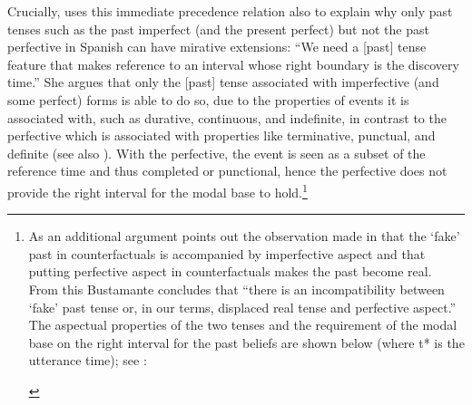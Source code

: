 \documentclass[output=paper,
colorlinks,
citecolor=brown,
newtxmath
]{langscibook}
\begin{document}
Crucially, \citet[112--114]{Bustamante2013} uses this immediate precedence relation also to explain why only past tenses such as the past imperfect (and the present perfect) but not the past perfective in Spanish can have mirative extensions:
``We need a [past] tense feature that makes reference to an interval whose right boundary is the discovery time.''
She argues that only the [past] tense associated with imperfective (and some perfect) forms is able to do so, due to the properties of events it is associated with, such as durative, continuous, and indefinite, in contrast to the perfective which is associated with properties like terminative, punctual, and definite (see also \citealt[300]{Cipria.Roberts2000}). With the perfective, the event is seen as a subset of the reference time and thus completed or punctional, hence the perfective does not provide the right interval for the modal base to hold.\footnote{As an additional argument \citet[112--113]{Bustamante2013} points out the observation made in \citet{Iatridou2000} that the `fake' past in counterfactuals is accompanied by imperfective aspect and that putting perfective aspect in counterfactuals makes the past become real. From this Bustamante concludes that ``there is an incompatibility between `fake' past tense or, in our terms, displaced real tense and perfective aspect.'' The aspectual properties of the two tenses and the requirement of the modal base on the right interval for the past beliefs are shown below (where t* is the utterance time); see \citet[114]{Bustamante2013}:\\
\begin{center}
\end{center}
}
\end{document}
